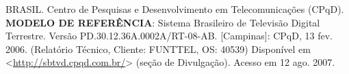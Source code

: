 \begin{thebibliography}{99}

    BRASIL. {C}entro de {P}esquisas e {D}esenvolvimento em {T}elecomunicações ({CPqD}).
    \textbf{MODELO DE REFERÊNCIA}: Sistema Brasileiro de Televisão Digital Terrestre.
    Versão PD.30.12.36A.0002A/RT-08-AB.
    [Campinas]: CPqD, 13 fev. 2006.
    (Relatório Técnico, Cliente: FUNTTEL, OS: 40539)
    Disponível em <\url{http://sbtvd.cpqd.com.br/}> (seção de Divulgação).
    Acesso em 12 ago. 2007.

\end{thebibliography}